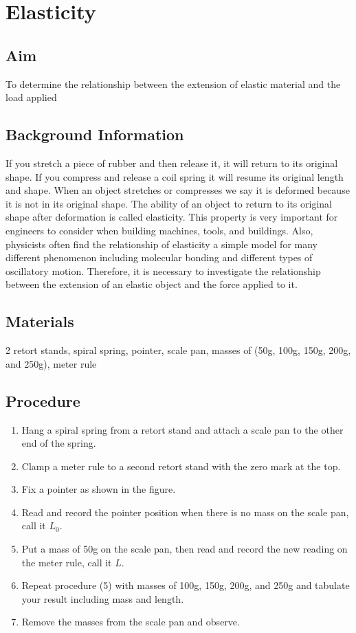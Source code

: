 \chapter{Elasticity}

\section{Aim}
To determine the relationship between the extension of elastic material and the load applied

\section{Background Information}
If you stretch a piece of rubber and then release it, it will return to its original shape. If you compress and release a coil spring it will resume its original length and shape. When an object stretches or compresses we say it is deformed because it is not in its original shape. The ability of an object to return to its original shape after deformation is called elasticity. This property is very important for engineers to consider when building machines, tools, and buildings. Also, physicists often find the relationship of elasticity a simple model for many different phenomenon including molecular bonding and different types of oscillatory motion. Therefore, it is necessary to investigate the relationship between the extension of an elastic object and the force applied to it.

\section{Materials}
2 retort stands, spiral spring, pointer, scale pan, masses of (50g, 100g, 150g, 200g, and 250g), meter rule

\section{Procedure}
\begin{enumerate}
\item Hang a spiral spring from a retort stand and attach a scale pan to the other end of the spring.
\item Clamp a meter rule to a second retort stand with the zero mark at the top.
\item	Fix a pointer as shown in the figure.
\item Read and record the pointer position when there is no mass on the scale pan, call it $L_0$.
\item Put a mass of 50g on the scale pan, then read and record the new reading on the meter rule, call it $L$.
\item Repeat procedure (5) with masses of 100g, 150g, 200g, and 250g and tabulate your result including mass and length.
\item Remove the masses from the scale pan and observe.
\end{enumerate}

